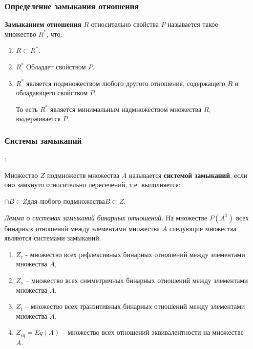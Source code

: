 \documentclass[bachelor, och, labwork]{shiza}
\begin{document}
\subsubsection{Определение замыкания отношения}

\textbf{Замыканием отношения} $R$ относительно свойства $P$ называется такое
множество $R^*$, что:

\begin{enumerate}

    \item $R \subset R^*$.

    \item $R^*$ Обладает свойством $P$.

    \item $R^*$ является подмножеством любого другого отношения, содержащего $R$
    и обладающего свойством $P$. 

    То есть $R^*$ является минимальным надмножеством множества $R$, 
    выдерживается $P$.

\end{enumerate}


\subsubsection{Системы замыканий}:

Множество $Z$ подмножеств множества $A$ называется \textbf{системой замыканий}, 
если оно замкнуто относительно пересечений, т.е. выполняется: 

\begin{center}$\cap B \in Z \text{для любого подмножества} B \subset Z$.\end{center}


\textit{Лемма о системах замыканий бинарных отношений.} 
На множестве $P(A^2)$ всех бинарных отношений между элементами множества $A$ 
следующие множества являются системами замыканий:

\begin{enumerate}
    
    \item $Z_r$ - множество всех рефлексивных бинарных отношений между 
    элементами множества $A$,
    
    \item $Z_s$ – множество всех симметричных бинарных отношений между 
    элементами множества $A$,
    
    \item $Z_t$ – множество всех транзитивных бинарных отношений между 
    элементами множества $A$,
    
    \item $Z_{eq} = Eq(A)$ – множество всех отношений эквивалентности на 
    множестве $A$.
\end{enumerate}
\end{document}
